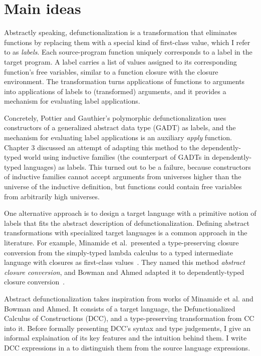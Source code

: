 
\section{Main ideas}
\label{sec:4.1}

Abstractly speaking, defunctionalization is a transformation that eliminates functions by replacing them with a special kind of first-class value, which I refer to as \textit{labels}. Each source-program function uniquely corresponds to a label in the target program. 
A label carries a list of values assigned to its corresponding function's free variables, similar to a function closure with the closure environment. 
The transformation turns applications of functions to arguments into applications of labels to (transformed) arguments, and it provides a mechanism for evaluating label applications.

Concretely, Pottier and Gauthier's polymorphic defunctionalization uses constructors of a generalized abstract data type (GADT) as labels, and the mechanism for evaluating label applications is an auxiliary \textit{apply} function. Chapter 3 discussed an attempt of adapting this method to the dependently-typed world using inductive families (the counterpart of GADTs in dependently-typed languages) as labels. 
This turned out to be a failure, because constructors of inductive families cannot accept arguments from universes higher than the universe of the inductive definition, but functions could contain free variables from arbitrarily high universes.

One alternative approach is to design a target language with a primitive notion of labels that fits the abstract description of defunctionalization. Defining abstract transformations with specialized target languages is a common approach in the literature. For example, Minamide et al.~presented a type-preserving closure conversion from the simply-typed lambda calculus to a typed intermediate language with closures as first-class values~\cite{DBLP:conf/popl/MinamideMH96}. They named this method \textit{abstract closure conversion}, and Bowman and Ahmed adapted it to dependently-typed closure conversion~\cite{DBLP:conf/pldi/BowmanA18}. 

Abstract defunctionalization takes inspiration from works of Minamide et al. and Bowman and Ahmed. It consists of a target language, the Defunctionalized Calculus of Constructions (DCC), and a type-preserving transformation from CC into it. 
Before formally presenting DCC's syntax and type judgements, I give an informal explaination of its key features and the intuition behind them. I write DCC expressions in a  \color{black} to distinguish them from the source language expressions.

